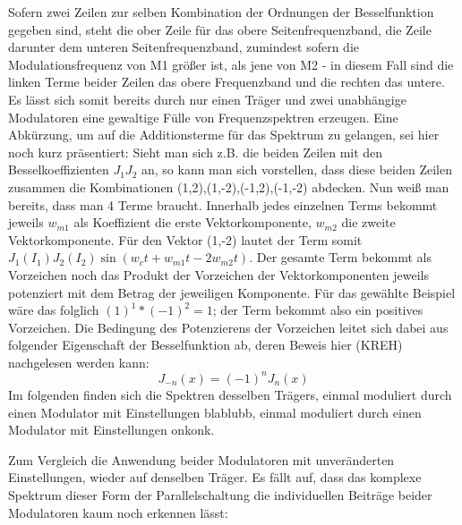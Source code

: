 Sofern zwei Zeilen zur selben Kombination der Ordnungen der Besselfunktion gegeben sind, steht die ober Zeile für das obere Seitenfrequenzband, die Zeile darunter dem unteren Seitenfrequenzband, zumindest sofern die Modulationsfrequenz von M1 größer ist, als jene von M2 - in diesem Fall sind die linken Terme beider Zeilen das obere Frequenzband und die rechten das untere. Es lässt sich somit bereits durch nur einen Träger und zwei unabhängige Modulatoren eine gewaltige Fülle von Frequenzspektren erzeugen. Eine Abkürzung, um auf die Additionsterme für das Spektrum zu gelangen, sei hier noch kurz präsentiert: Sieht man sich z.B. die beiden Zeilen mit den Besselkoeffizienten \begin{math} J_1J_2 \end{math} an, so kann man sich vorstellen, dass diese beiden Zeilen zusammen die Kombinationen (1,2),(1,-2),(-1,2),(-1,-2) abdecken. Nun weiß man bereits, dass man 4 Terme braucht. Innerhalb jedes einzelnen Terms bekommt jeweils \begin{math} w_{m1} \end{math} als Koeffizient die erste Vektorkomponente, \begin{math} w_{m2} \end{math} die zweite Vektorkomponente. Für den Vektor (1,-2) lautet der Term somit \begin{math} J_1(I_1)J_2(I_2)\sin(w_ct + w_{m1}t - 2w_{m2}t) \end{math}. Der gesamte Term bekommt als Vorzeichen noch das Produkt der Vorzeichen der Vektorkomponenten jeweils potenziert mit dem Betrag der jeweiligen Komponente. Für das gewählte Beispiel wäre das folglich \begin{math} (1)^1*(-1)^2 = 1 \end{math}; der Term bekommt also ein positives Vorzeichen. Die Bedingung des Potenzierens der Vorzeichen leitet sich dabei aus folgender Eigenschaft der Besselfunktion ab, deren Beweis hier (KREH) nachgelesen werden kann:
\begin{equation}
J_{-n}(x) = (-1)^nJ_n(x)
\end{equation}
Im folgenden finden sich die Spektren desselben Trägers, einmal moduliert durch einen Modulator mit Einstellungen blablubb,
einmal moduliert durch einen Modulator mit Einstellungen onkonk.

Zum Vergleich die Anwendung beider Modulatoren mit unveränderten Einstellungen, wieder auf denselben Träger. Es fällt auf, dass das komplexe Spektrum dieser Form der Parallelschaltung die individuellen Beiträge beider Modulatoren kaum noch erkennen lässt:


